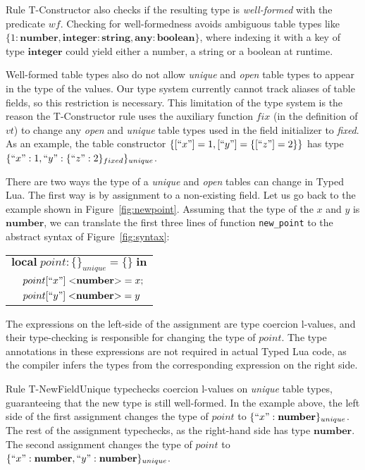 \documentclass[preprint]{sigplanconf}
\newcommand{\Any}{\mathbf{any}}
\newcommand{\Boolean}{\mathbf{boolean}}
\newcommand{\Integer}{\mathbf{integer}}
\newcommand{\Number}{\mathbf{number}}
\newcommand{\String}{\mathbf{string}}
\begin{document}
Rule {\sc T-Constructor} also checks if the resulting type is {\em well-formed} with the predicate $wf$. Checking for well-formedness avoids ambiguous table types like
$\{1:\Number, \Integer:\String, \Any:\Boolean\}$,
where indexing it with a key of type $\Integer$ could
yield either a number, a string or a boolean at runtime.

Well-formed table types also do not allow \emph{unique} and
\emph{open} table types to appear in the type of the values.
Our type system currently cannot
track aliases of table fields, so this restriction is
necessary. This limitation of the type system is the reason the {\sc T-Constructor} rule uses the auxiliary function $fix$
(in the definition of $vt$)
 to change any {\em open} and {\em unique} table types used in the field initializer to {\em fixed}. As an example, the table constructor $\{[``x"] = 1, [``y"] = \{[``z"] = 2\}\}$
has type $\{``x":1, ``y":\{``z":2\}_{fixed}\}_{unique}$.

There are two ways the type of a {\em unique} and {\em open} tables can change in Typed
Lua. The first way is by assignment to a non-existing
field. Let us go back to the example shown in Figure~\ref{fig:newpoint}. Assuming that the type of the
$x$ and $y$ is $\Number$, we can translate the first three lines
of function {\tt new\_point} to the abstract syntax of Figure~\ref{fig:syntax}:
\begin{center}
\begin{tabular}{ll}
\multicolumn{2}{l}{$\mathbf{local} \; point: \{\}_{unique} = \{\} \; \mathbf{in}$}\\
& \multicolumn{1}{l}{$point[``x"] \; {<}\Number{>} = x;$}\\
& \multicolumn{1}{l}{$point[``y"] \; {<}\Number{>} = y$}
\end{tabular}
\end{center}

The expressions on the left-side of the assignment are type
coercion l-values, and their type-checking is responsible
for changing the type of $point$. The type annotations in
these expressions are not
required in actual Typed Lua code, as the compiler infers the types from the corresponding expression on the right side.

Rule {\sc T-NewFieldUnique} typechecks coercion l-values on
{\em unique} table types, guaranteeing that the new type
is still well-formed. In the example above, the left
side of the first assignment changes the type of $point$
to $\{``x":\Number\}_{unique}$. The rest of the assignment
typechecks, as the right-hand side has type $\Number$.
The second assignment changes the type of $point$ to
$\{``x":\Number, ``y": \Number\}_{unique}$.
\end{document}

